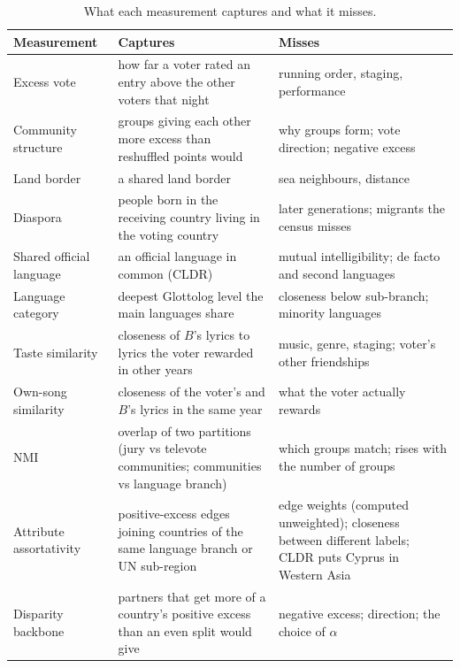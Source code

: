 \begin{table}[t]
\centering
\caption{What each measurement captures and what it misses.}
\label{tab:measures}
\small
\begin{tabular}{p{}p{}p{}}  %
\hline
Measurement & Captures & Misses \\ \hline
Excess vote & how far a voter rated an entry above the other voters that night & running order, staging, performance \\
Community structure & groups giving each other more excess than reshuffled points would & why groups form; vote direction; negative excess \\
Land border & a shared land border & sea neighbours, distance \\
Diaspora & people born in the receiving country living in the voting country & later generations; migrants the census misses \\
Shared official language & an official language in common (CLDR) & mutual intelligibility; de facto and second languages \\
Language category & deepest Glottolog level the main languages share & closeness below sub-branch; minority languages \\
Taste similarity & closeness of $B$'s lyrics to lyrics the voter rewarded in other years & music, genre, staging; voter's other friendships \\
Own-song similarity & closeness of the voter's and $B$'s lyrics in the same year & what the voter actually rewards \\
NMI & overlap of two partitions (jury vs televote communities; communities vs language branch) & which groups match; rises with the number of groups \\
Attribute assortativity & positive-excess edges joining countries of the same language branch or UN sub-region & edge weights (computed unweighted); closeness between different labels; CLDR puts Cyprus in Western Asia \\
Disparity backbone & partners that get more of a country's positive excess than an even split would give & negative excess; direction; the choice of $\alpha$ \\
\hline
\end{tabular}
\end{table}
